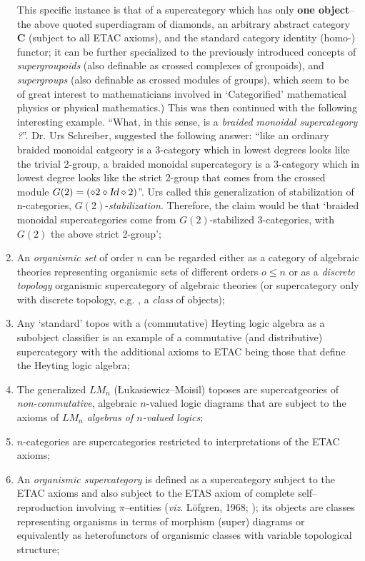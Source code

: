 \documentclass[12pt]{article}
\theoremstyle{plain}
\theoremstyle{definition}
\numberwithin{equation}{section}
\begin{document}
\begin{enumerate}
 This specific instance is that of a supercategory which has only \textbf{one object}-- the above quoted superdiagram of diamonds, an arbitrary abstract category \textbf{C} (subject to all ETAC axioms), and the standard category identity (homo-) functor; it can be further specialized to the previously introduced concepts of \textit{supergroupoids} (also definable as crossed complexes of groupoids), and \textit{supergroups} (also definable as crossed modules of groups), which seem to be of great interest to mathematicians involved in `Categorified' mathematical physics or physical mathematics.) This was then continued with the following interesting example. ``What, in this sense, is a \textit{braided monoidal supercategory ?}''. Dr. Urs Schreiber, suggested the following answer: ``like an ordinary braided monoidal catgeory is a 3-category which in lowest degrees looks like the trivial 2-group, a braided monoidal supercategory is a 3-category which in lowest degree looks like the strict 2-group that comes from 
the crossed module $G(2)=(\diamond 2 \diamond \textsl{Id} \diamond 2)$''. Urs called this generalization of stabilization of n-categories, $G(2)$-\textit{stabilization}. Therefore, the claim would be that `braided monoidal supercategories come from $G(2)$-stabilized 3-categories, with $G(2)$ the above strict 2-group';

\item An \emph{organismic set} of order $n$ can be regarded either as a category of algebraic 
theories representing organismic sets of different orders $o \leq n$ or as a \emph{discrete topology} organismic supercategory of algebraic theories (or supercategory only with discrete topology, e.g. , a {\em class} of objects); 
\item Any `standard' topos with a (commutative) Heyting logic algebra as a subobject classifier is an example of
a commutative (and distributive) supercategory with the additional axioms to ETAC being those that
define the Heyting logic algebra;
\item The generalized $LM_n$ (\L ukasiewicz--Moisil) toposes are supercatgeories of 
{\em non-commutative}, algebraic $n$-valued logic diagrams that are subject to the axioms of {\em $LM_n$ algebras of 
$n$-valued logics};
\item $n$-categories are supercategories restricted to interpretations of the ETAC axioms;
\item An {\em organismic supercategory} is defined as a supercategory subject to the ETAC axioms
and also subject to the ETAS axiom of complete self--reproduction involving
$\pi$--entities ({\em viz}. L\"ofgren, 1968; \cite{Refs-13to26}); its objects are classes representing organisms
in terms of morphism (super) diagrams or equivalently as heterofunctors of organismic classes 
with variable topological structure;
\end{enumerate}
\end{document}
